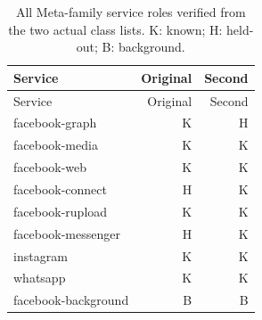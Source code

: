 \begingroup\small\setlength{\tabcolsep}{3pt}
\begin{longtable}{lrr}
\caption{All Meta-family service roles verified from the two actual class lists. K: known; H: held-out; B: background.}\label{tab:final-meta-roles}\\
\toprule
Service & Original & Second\\
\midrule
\endfirsthead
\toprule
Service & Original & Second\\
\midrule
\endhead
facebook-graph & K & H\\
facebook-media & K & K\\
facebook-web & K & K\\
facebook-connect & H & K\\
facebook-rupload & K & K\\
facebook-messenger & H & K\\
instagram & K & K\\
whatsapp & K & K\\
facebook-background & B & B\\
\bottomrule
\end{longtable}
\endgroup

